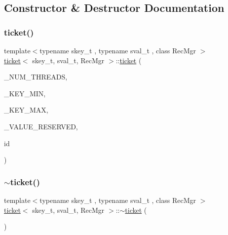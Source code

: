 \subsection{Constructor \& Destructor Documentation}
\mbox{\label{classticket_aecd4fbf1e68e74e9959ce2f5e2b05bf5}} 
\subsubsection{\texorpdfstring{ticket()}{ticket()}}
{\footnotesize\ttfamily template$<$typename skey\+\_\+t , typename sval\+\_\+t , class Rec\+Mgr $>$ \\
\hyperlink{classticket}{ticket}$<$ skey\+\_\+t, sval\+\_\+t, Rec\+Mgr $>$\+::\hyperlink{classticket}{ticket} (\begin{DoxyParamCaption}\item[{const int}]{\+\_\+\+N\+U\+M\+\_\+\+T\+H\+R\+E\+A\+DS,  }\item[{const skey\+\_\+t \&}]{\+\_\+\+K\+E\+Y\+\_\+\+M\+IN,  }\item[{const skey\+\_\+t \&}]{\+\_\+\+K\+E\+Y\+\_\+\+M\+AX,  }\item[{const sval\+\_\+t \&}]{\+\_\+\+V\+A\+L\+U\+E\+\_\+\+R\+E\+S\+E\+R\+V\+ED,  }\item[{unsigned int}]{id }\end{DoxyParamCaption})\hspace{0.3cm}{\ttfamily [inline]}}

\mbox{\label{classticket_ac4b9d890af8742df497a89a926dccde9}} 
\subsubsection{\texorpdfstring{$\sim$ticket()}{~ticket()}}
{\footnotesize\ttfamily template$<$typename skey\+\_\+t , typename sval\+\_\+t , class Rec\+Mgr $>$ \\
\hyperlink{classticket}{ticket}$<$ skey\+\_\+t, sval\+\_\+t, Rec\+Mgr $>$\+::$\sim$\hyperlink{classticket}{ticket} (\begin{DoxyParamCaption}{ }\end{DoxyParamCaption})\hspace{0.3cm}{\ttfamily [inline]}}



